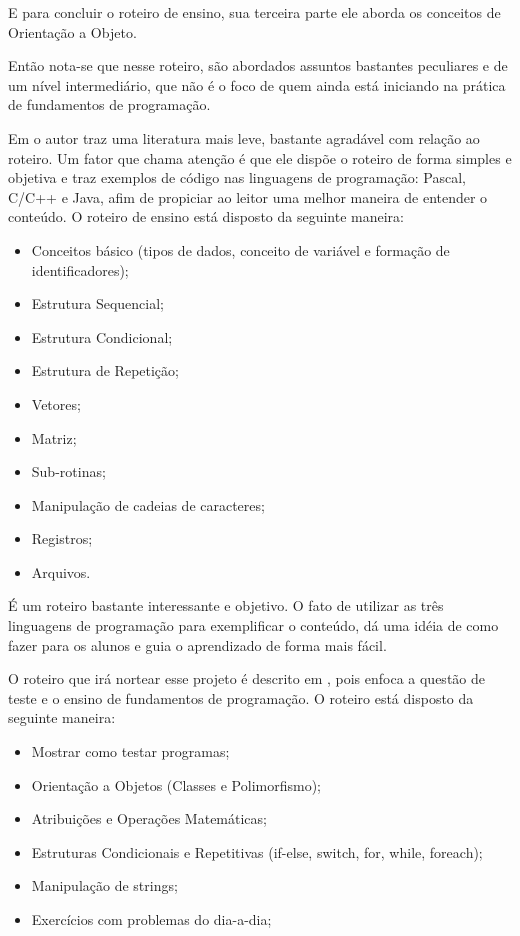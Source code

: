 \documentclass[pnumabnt,normaltoc,espacoumemeio,capchap]{abnt}
\begin{document}
\par E para concluir o roteiro de ensino, sua terceira parte ele aborda os conceitos de Orientação a Objeto.
\par Então nota-se que nesse roteiro, são abordados assuntos bastantes peculiares e de um nível intermediário, que não é o foco de quem ainda está iniciando na prática de fundamentos de programação.
\par Em  o autor traz uma literatura mais leve, bastante agradável com relação ao roteiro. Um fator que chama atenção é que ele dispõe o roteiro de forma simples e objetiva e traz exemplos de código nas linguagens de programação: Pascal, C/C++ e Java, afim de propiciar ao leitor uma melhor maneira de entender o conteúdo. O roteiro de ensino está disposto da seguinte maneira:
\begin{itemize}
\item Conceitos básico (tipos de dados, conceito de variável e formação de identificadores);
\item Estrutura Sequencial;
\item Estrutura Condicional;
\item Estrutura de Repetição;
\item Vetores;
\item Matriz;
\item Sub-rotinas;
\item Manipulação de cadeias de caracteres;
\item Registros;
\item Arquivos.
\end{itemize}
\par É um roteiro bastante interessante e objetivo. O fato de utilizar as três linguagens de programação para exemplificar o conteúdo, dá uma idéia de como fazer para os alunos e guia o aprendizado de forma mais fácil.
\par O roteiro que irá nortear esse projeto é descrito em , pois enfoca a questão de teste e o ensino de fundamentos de programação. O roteiro está disposto da seguinte maneira:
\begin{itemize}
\item Mostrar como testar programas;
\item Orientação a Objetos (Classes e Polimorfismo);
\item Atribuições e Operações Matemáticas;
\item Estruturas Condicionais e Repetitivas (if-else, switch, for, while, foreach);
\item Manipulação de strings;
\item Exercícios com problemas do dia-a-dia;
\end{itemize}
\end{document}
